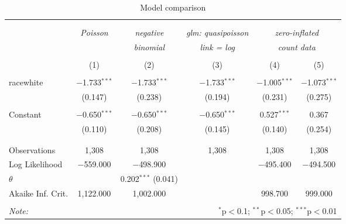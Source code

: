 
\begin{table}[!htbp] \centering 
  \caption{Model comparison} 
  \label{tab:stargazer_comparison} 
\small 
\begin{tabular}{@{\extracolsep{5pt}}lccccc} 
\\[-1.8ex]\hline 
\hline \\[-1.8ex] 
\\[-1.8ex] & \textit{Poisson} & \textit{negative} & \textit{glm: quasipoisson} & \multicolumn{2}{c}{\textit{zero-inflated}} \\ 
 & \textit{} & \textit{binomial} & \textit{link = log} & \multicolumn{2}{c}{\textit{count data}} \\ 
\\[-1.8ex] & (1) & (2) & (3) & (4) & (5)\\ 
\hline \\[-1.8ex] 
 racewhite & $-$1.733$^{***}$ & $-$1.733$^{***}$ & $-$1.733$^{***}$ & $-$1.005$^{***}$ & $-$1.073$^{***}$ \\ 
  & (0.147) & (0.238) & (0.194) & (0.231) & (0.275) \\ 
  & & & & & \\ 
 Constant & $-$0.650$^{***}$ & $-$0.650$^{***}$ & $-$0.650$^{***}$ & 0.527$^{***}$ & 0.367 \\ 
  & (0.110) & (0.208) & (0.145) & (0.140) & (0.254) \\ 
  & & & & & \\ 
\hline \\[-1.8ex] 
Observations & 1,308 & 1,308 & 1,308 & 1,308 & 1,308 \\ 
Log Likelihood & $-$559.000 & $-$498.900 &  & $-$495.400 & $-$494.500 \\ 
$\theta$ &  & 0.202$^{***}$  (0.041) &  &  &  \\ 
Akaike Inf. Crit. & 1,122.000 & 1,002.000 &  & 998.700 & 999.000 \\ 
\hline 
\hline \\[-1.8ex] 
\textit{Note:}  & \multicolumn{5}{r}{$^{*}$p$<$0.1; $^{**}$p$<$0.05; $^{***}$p$<$0.01} \\ 
\end{tabular} 
\end{table} 
